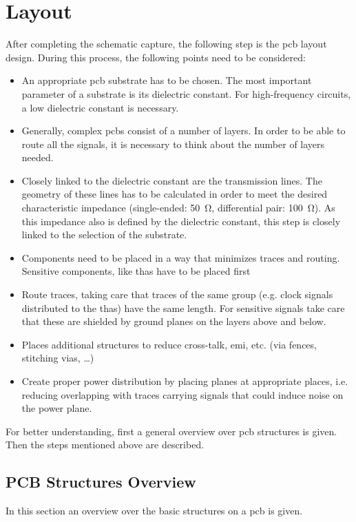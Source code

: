 \section{Layout}
After completing the schematic capture, the following step is the \gls{pcb} layout design.
During this process, the following points need to be considered:
\begin{itemize}
	\item An appropriate \gls{pcb} substrate has to be chosen. The most important parameter of a substrate is its dielectric constant. For high-frequency circuits, a low dielectric constant is necessary.
	\item Generally, complex \glspl{pcb} consist of a number of layers. In order to be able to route all the signals, it is necessary to think about the number of layers needed. 
	\item Closely linked to the dielectric constant are the transmission lines. The geometry of these lines has to be calculated in order to meet the desired characteristic impedance (single-ended: \SI{50}{\ohm}, differential pair: \SI{100}{\ohm}). As this impedance also is defined by the dielectric constant, this step is closely linked to the selection of the substrate.
	\item Components need to be placed in a way that minimizes traces and routing. Sensitive components, like \glspl{tha} have to be placed first 
	\item Route traces, taking care that traces of the same group (e.g. clock signals distributed to the \glspl{tha}) have the same length. For sensitive signals take care that these are shielded by ground planes on the layers above and below.
	\item Places additional structures to reduce cross-talk, \gls{emi}, etc. (via fences, stitching vias, \dots)
	\item Create proper power distribution by placing planes at appropriate places, i.e. reducing overlapping with traces carrying signals that could induce noise on the power plane.
\end{itemize}

For better understanding, first a general overview over \gls{pcb} structures is given. 
Then the steps mentioned above are described.
\subsection*{PCB Structures Overview} \label{ssec:pcb_structs}
In this section an overview over the basic structures on a \gls{pcb} is given.

